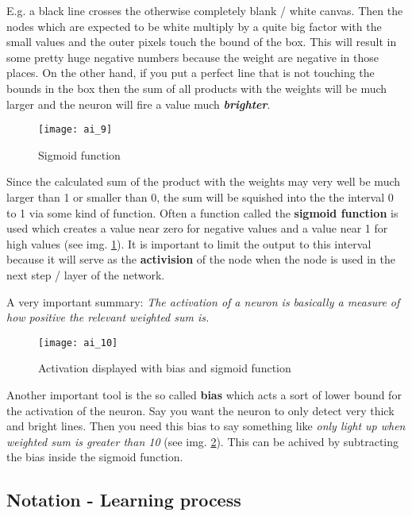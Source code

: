 \documentclass{article}
\begin{document}
E.g. a black line crosses the otherwise completely blank / white canvas. Then the nodes which are expected to be white multiply by a quite big factor with the small values and the outer pixels touch the bound of the box. This will result in some pretty huge negative numbers because the weight are negative in those places. On the other hand, if you put a perfect line that is not touching the bounds in the box then the sum of all products with the weights will be much larger and the neuron will fire a value much \textit{\textbf{brighter}}.

\begin{figure}[h]
	\centering
	\texttt{[image: ai\_9]}
	\caption{Sigmoid function}
	\label{ai_9}
\end{figure}

Since the calculated sum of the product with the weights may very well be much larger than 1 or smaller than 0, the sum will be squished into the the interval 0 to 1 via some kind of function. Often a function called the \textbf{sigmoid function} is used which creates a value near zero for negative values and a value near 1 for high values (see img. \ref{ai_9}). It is important to limit the output to this interval because it will serve as the \textbf{activision} of the node when the node is used in the next step / layer of the network. 

A very important summary: \textit{The activation of a neuron is basically a measure of how positive the relevant weighted sum is.}


\begin{figure}[h]
	\centering
	\texttt{[image: ai\_10]}
	\caption{Activation displayed with bias and sigmoid function}
	\label{ai_10}
\end{figure}

Another important tool is the so called \textbf{bias} which acts a sort of lower bound for the activation of the neuron. Say you want the neuron to only detect very thick and bright lines. Then you need this bias to say something like \textit{only light up when weighted sum is greater than 10} (see img. \ref{ai_10}). This can be achived by subtracting the bias inside the sigmoid function.



\subsection{Notation - Learning process}
\end{document}
